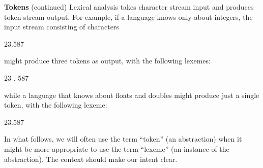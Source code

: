 \begin{minipage}[t]{\sw}
\slidenumber
\LARGE
{\bf Tokens} (continued)\exx
Lexical analysis takes character stream input
and produces token stream output.
For example, if a language knows only about integers,
the input stream consisting of characters
\begin{qv}
23.587
\end{qv}
might produce three tokens as output, with the following lexemes:
\begin{qv}
23
.
587
\end{qv}
while a language that knows about floats and doubles
might produce just a single token, with the following lexeme:
\begin{qv}
23.587
\end{qv}
In what follows, we will often use the term
``token'' (an abstraction) when it might be more appropriate
to use the term ``lexeme'' (an instance of the abstraction). 
The context should make our intent clear.
\end{minipage}
